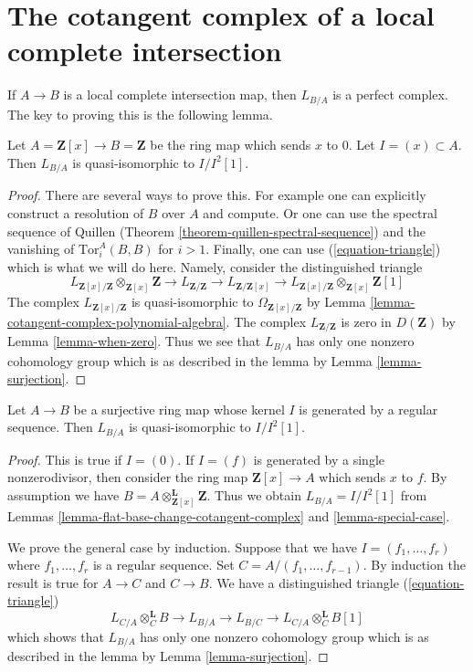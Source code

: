 \section{The cotangent complex of a local complete intersection}
\label{section-lci}

\noindent
If $A \to B$ is a local complete intersection map, then
$L_{B/A}$ is a perfect complex. The key to proving this is
the following lemma.

\begin{lemma}
\label{lemma-special-case}
Let $A = \mathbf{Z}[x] \to B = \mathbf{Z}$ be the ring map which sends
$x$ to $0$. Let $I = (x) \subset A$. Then $L_{B/A}$ is quasi-isomorphic to
$I/I^2[1]$.
\end{lemma}

\begin{proof}
There are several ways to prove this. For example one can explicitly construct
a resolution of $B$ over $A$ and compute. Or one can use the spectral sequence
of Quillen (Theorem \ref{theorem-quillen-spectral-sequence})
and the vanishing of $\text{Tor}_i^A(B, B)$ for $i > 1$.
Finally, one can use (\ref{equation-triangle}) which is what we will do here.
Namely, consider the distinguished triangle
$$
L_{\mathbf{Z}[x]/\mathbf{Z}} \otimes_{\mathbf{Z}[x]} \mathbf{Z} \to
L_{\mathbf{Z}/\mathbf{Z}} \to
L_{\mathbf{Z}/\mathbf{Z}[x]}\to
L_{\mathbf{Z}[x]/\mathbf{Z}} \otimes_{\mathbf{Z}[x]} \mathbf{Z}[1]
$$
The complex $L_{\mathbf{Z}[x]/\mathbf{Z}}$ is quasi-isomorphic to
$\Omega_{\mathbf{Z}[x]/\mathbf{Z}}$ by
Lemma \ref{lemma-cotangent-complex-polynomial-algebra}.
The complex $L_{\mathbf{Z}/\mathbf{Z}}$ is zero in $D(\mathbf{Z})$ by
Lemma \ref{lemma-when-zero}.
Thus we see that $L_{B/A}$ has only one nonzero cohomology group
which is as described in the lemma by Lemma \ref{lemma-surjection}.
\end{proof}

\begin{lemma}
\label{lemma-mod-regular-sequence}
Let $A \to B$ be a surjective ring map whose kernel $I$ is generated
by a regular sequence. Then $L_{B/A}$ is quasi-isomorphic to $I/I^2[1]$.
\end{lemma}

\begin{proof}
This is true if $I = (0)$. If $I = (f)$ is generated by a single
nonzerodivisor, then consider the ring map $\mathbf{Z}[x] \to A$
which sends $x$ to $f$. By assumption we have
$B = A \otimes_{\mathbf{Z}[x]}^\mathbf{L} \mathbf{Z}$.
Thus we obtain $L_{B/A} = I/I^2[1]$ from
Lemmas \ref{lemma-flat-base-change-cotangent-complex} and
\ref{lemma-special-case}.

\medskip\noindent
We prove the general case by induction. Suppose that we have
$I = (f_1, \ldots, f_r)$ where $f_1, \ldots, f_r$ is a regular sequence.
Set $C = A/(f_1, \ldots, f_{r - 1})$. By induction the result is
true for $A \to C$ and $C \to B$. We have a distinguished triangle
(\ref{equation-triangle})
$$
L_{C/A} \otimes_C^\mathbf{L} B \to L_{B/A} \to L_{B/C} \to
L_{C/A} \otimes_C^\mathbf{L} B[1]
$$
which shows that $L_{B/A}$ has only one nonzero cohomology group
which is as described in the lemma by Lemma \ref{lemma-surjection}.
\end{proof}

